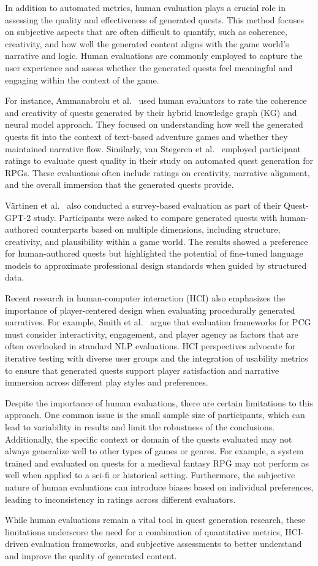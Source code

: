 In addition to automated metrics, human evaluation plays a crucial role in assessing
the quality and effectiveness of generated quests. This method focuses on subjective
aspects that are often difficult to quantify, such as coherence, creativity, and how well the
generated content aligns with the game world's narrative and logic. Human evaluations
are commonly employed to capture the user experience and assess whether the generated
quests feel meaningful and engaging within the context of the game.

For instance, Ammanabrolu et al.~\cite{ammanabrolu2019toward} used human evaluators to rate the coherence
and creativity of quests generated by their hybrid knowledge graph (KG) and neural
model approach. They focused on understanding how well the generated quests fit into
the context of text-based adventure games and whether they maintained narrative flow.
Similarly, van Stegeren et al.~\cite{van2021fine} employed participant ratings to evaluate quest quality
in their study on automated quest generation for RPGs. These evaluations often include
ratings on creativity, narrative alignment, and the overall immersion that the generated
quests provide.

Värtinen et al.~\cite{vartinen2022generating} also conducted a survey-based evaluation as part of their Quest-GPT-2
study. Participants were asked to compare generated quests with human-authored
counterparts based on multiple dimensions, including structure, creativity, and plausibility
within a game world. The results showed a preference for human-authored quests but
highlighted the potential of fine-tuned language models to approximate professional design
standards when guided by structured data.

Recent research in human-computer interaction (HCI) also emphasizes the importance
of player-centered design when evaluating procedurally generated narratives. For example,
Smith et al.~\cite{smith2011pcg} argue that evaluation frameworks for PCG must consider interactivity,
engagement, and player agency as factors that are often overlooked in standard NLP
evaluations. HCI perspectives advocate for iterative testing with diverse user groups
and the integration of usability metrics to ensure that generated quests support player
satisfaction and narrative immersion across different play styles and preferences.

Despite the importance of human evaluations, there are certain limitations to this
approach. One common issue is the small sample size of participants, which can lead to
variability in results and limit the robustness of the conclusions. Additionally, the specific
context or domain of the quests evaluated may not always generalize well to other types
of games or genres. For example, a system trained and evaluated on quests for a medieval
fantasy RPG may not perform as well when applied to a sci-fi or historical setting.
Furthermore, the subjective nature of human evaluations can introduce biases based on
individual preferences, leading to inconsistency in ratings across different evaluators.

While human evaluations remain a vital tool in quest generation research, these limitations
underscore the need for a combination of quantitative metrics, HCI-driven evaluation
frameworks, and subjective assessments to better understand and improve the quality of
generated content.

\newpage

